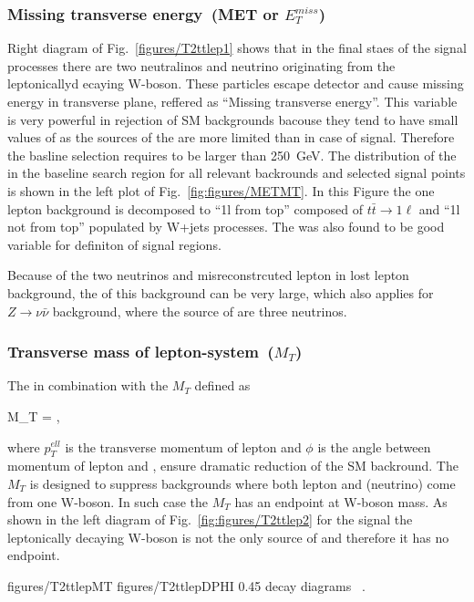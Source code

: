 \subsubsection{Missing transverse energy~(MET or $E_{T}^{miss}$)}

Right diagram of Fig.~\ref{figures/T2ttlep1} shows that in the final staes of the signal processes there are two neutralinos and neutrino originating from the leptonicallyd ecaying W-boson. These particles escape detector and cause missing energy in transverse plane, reffered as ``Missing transverse energy''. This variable is very powerful in rejection of SM backgrounds bacouse they tend to have small values of \MET as the sources of the \MET are more limited than in case of signal. Therefore the basline selection requires \MET to be larger than 250~GeV. The distribution of the \MET in the baseline search region for all relevant backrounds and selected signal points is shown in the left plot of Fig.~\ref{fig:figures/METMT}. In this Figure the one lepton background is decomposed to ``1l from top'' composed of $t \bar{t} \to 1\ell$ and ``1l not from top'' populated by W+jets processes. The \MET was also found to be good variable for definiton of signal regions.

Because of the two neutrinos and misreconstrcuted lepton in lost lepton background, the \MET of this background can be very large, which also applies for $Z \to \nu \bar{\nu}$ background, where the source of \MET are three neutrinos.

\subsubsection{Transverse mass of lepton-\MET system~($M_{T}$)}

The \MET in combination with the $M_{T}$ defined as

{
 M_{T} =  ,
}

where $p_{T}^{ell}$ is the transverse momentum of lepton and $\phi$ is the angle between momentum of lepton and \MET, ensure dramatic reduction of the SM backround. The $M_{T}$ is  designed to suppress backgrounds where both lepton and \MET (neutrino) come from one W-boson. In such case the $M_{T}$ has an endpoint at W-boson mass. As shown in the left diagram of Fig.~\ref{fig:figures/T2ttlep2} for the signal the leptonically decaying W-boson is not the only source of \MET and therefore it has no endpoint.

                 {figures/T2ttlepMT} %
                 {figures/T2ttlepDPHI} %
                 {0.45}       %
                 { decay diagrams ~\cite{CMS:2016vew}. }

